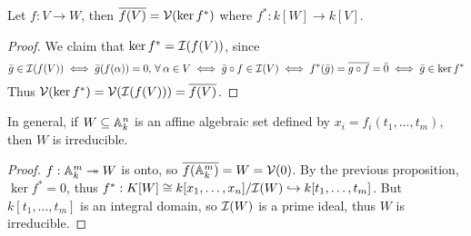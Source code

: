 \begin{prop}
  Let $f : V \to W$, then $\overline{f(V)} = \mathcal{V}(\ker f^*)$ where $f^* : k[W] \to k[V]$.
  \begin{proof}
    We claim that $\ker f^* = \mathcal{I}(f(V))$, since
    \[ \bar{g} \in \Ic(f(V)) \iff \bar{g}(f(\alpha)) = 0, \, \forall \alpha \in V
      \iff \bar{g} \circ f \in \Ic(V)
      \iff f^*(\bar{g}) = \overline{g \circ f} = \bar{0}
      \iff \bar{g} \in \ker f^* \]
    Thus $\mathcal{V}(\ker f^*) = \mathcal{V}(\mathcal{I}(f(V))) = \overline{f(V)}$.
  \end{proof}
\end{prop}

\begin{remark}
  In general, if $W \subseteq \mathbb{A}_k^n$ is an affine algebraic set defined by
  $x_i = f_i(t_1, \dots, t_m)$, then $W$ is irreducible.
  \begin{proof}
    $f : \mathbb{A}^m_k \twoheadrightarrow W$ is onto, so $\overline{f(\mathbb{A}^m_k)}
    = W = \mathcal{V}(0)$. By the previous proposition, $\ker f^* = 0$,
    thus $f^* : K[W] \cong k[x_1, \dots, x_n] / \mathcal{I}(W) \hookrightarrow k[t_1, \dots, t_m]$.
    But $k[t_1, \dots, t_m]$ is an integral domain, so $\mathcal{I}(W)$ is a prime ideal,
    thus $W$ is irreducible.
  \end{proof}
\end{remark}

